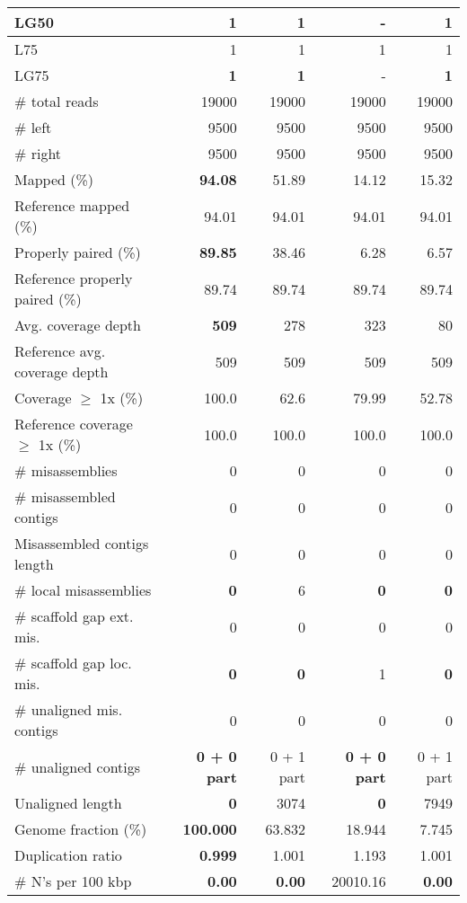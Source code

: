 \documentclass[12pt,a4paper]{article}
\begin{document}
\begin{table}[ht]
\begin{center}
\begin{tabular}{|l*{4}{|r}|}
LG50 & {\bf 1} & {\bf 1} & - & {\bf 1} \\ \hline
L75 & 1 & 1 & 1 & 1 \\ \hline
LG75 & {\bf 1} & {\bf 1} & - & {\bf 1} \\ \hline
\# total reads & 19000 & 19000 & 19000 & 19000 \\ \hline
\# left & 9500 & 9500 & 9500 & 9500 \\ \hline
\# right & 9500 & 9500 & 9500 & 9500 \\ \hline
Mapped (\%) & {\bf 94.08} & 51.89 & 14.12 & 15.32 \\ \hline
Reference mapped (\%) & 94.01 & 94.01 & 94.01 & 94.01 \\ \hline
Properly paired (\%) & {\bf 89.85} & 38.46 & 6.28 & 6.57 \\ \hline
Reference properly paired (\%) & 89.74 & 89.74 & 89.74 & 89.74 \\ \hline
Avg. coverage depth & {\bf 509} & 278 & 323 & 80 \\ \hline
Reference avg. coverage depth & 509 & 509 & 509 & 509 \\ \hline
Coverage $\geq$ 1x (\%) & 100.0 & 62.6 & 79.99 & 52.78 \\ \hline
Reference coverage $\geq$ 1x (\%) & 100.0 & 100.0 & 100.0 & 100.0 \\ \hline
\# misassemblies & 0 & 0 & 0 & 0 \\ \hline
\# misassembled contigs & 0 & 0 & 0 & 0 \\ \hline
Misassembled contigs length & 0 & 0 & 0 & 0 \\ \hline
\# local misassemblies & {\bf 0} & 6 & {\bf 0} & {\bf 0} \\ \hline
\# scaffold gap ext. mis. & 0 & 0 & 0 & 0 \\ \hline
\# scaffold gap loc. mis. & {\bf 0} & {\bf 0} & 1 & {\bf 0} \\ \hline
\# unaligned mis. contigs & 0 & 0 & 0 & 0 \\ \hline
\# unaligned contigs & {\bf 0 + 0 part} & 0 + 1 part & {\bf 0 + 0 part} & 0 + 1 part \\ \hline
Unaligned length & {\bf 0} & 3074 & {\bf 0} & 7949 \\ \hline
Genome fraction (\%) & {\bf 100.000} & 63.832 & 18.944 & 7.745 \\ \hline
Duplication ratio & {\bf 0.999} & 1.001 & 1.193 & 1.001 \\ \hline
\# N's per 100 kbp & {\bf 0.00} & {\bf 0.00} & 20010.16 & {\bf 0.00} \\ \hline

\end{tabular}
\end{center}
\end{table}
\end{document}
